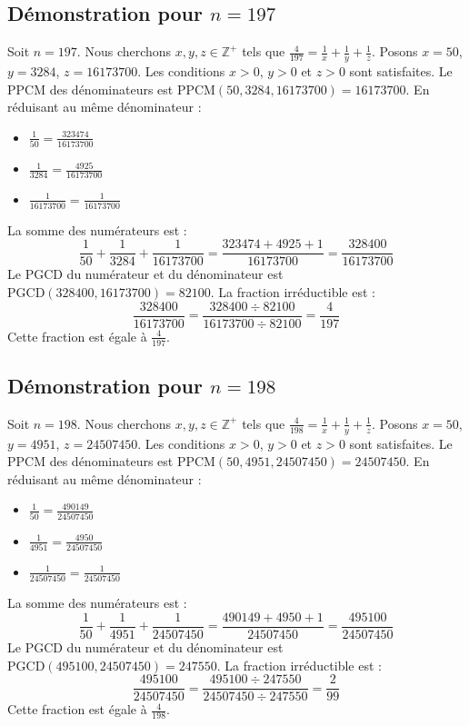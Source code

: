 \documentclass[11pt,a4paper]{article}
\begin{document}
\subsection{Démonstration pour $n = 197$}
Soit $n = 197$. Nous cherchons $x, y, z \in \mathbb{Z}^{+}$ tels que $\frac{4}{197} = \frac{1}{x} + \frac{1}{y} + \frac{1}{z}$.
Posons $x = 50$, $y = 3284$, $z = 16173700$.
Les conditions $x > 0$, $y > 0$ et $z > 0$ sont satisfaites.
Le PPCM des dénominateurs est $\text{PPCM}(50, 3284, 16173700) = 16173700$.
En réduisant au même dénominateur :
\begin{itemize}
    \item $\frac{1}{50} = \frac{323474}{16173700}$
    \item $\frac{1}{3284} = \frac{4925}{16173700}$
    \item $\frac{1}{16173700} = \frac{1}{16173700}$
\end{itemize}
La somme des numérateurs est :
$$ \frac{1}{50} + \frac{1}{3284} + \frac{1}{16173700} = \frac{323474 + 4925 + 1}{16173700} = \frac{328400}{16173700} $$
Le PGCD du numérateur et du dénominateur est $\text{PGCD}(328400, 16173700) = 82100$.
La fraction irréductible est :
$$ \frac{328400}{16173700} = \frac{328400 \div 82100}{16173700 \div 82100} = \frac{4}{197} $$
Cette fraction est égale à $\frac{4}{197}$.

\subsection{Démonstration pour $n = 198$}
Soit $n = 198$. Nous cherchons $x, y, z \in \mathbb{Z}^{+}$ tels que $\frac{4}{198} = \frac{1}{x} + \frac{1}{y} + \frac{1}{z}$.
Posons $x = 50$, $y = 4951$, $z = 24507450$.
Les conditions $x > 0$, $y > 0$ et $z > 0$ sont satisfaites.
Le PPCM des dénominateurs est $\text{PPCM}(50, 4951, 24507450) = 24507450$.
En réduisant au même dénominateur :
\begin{itemize}
    \item $\frac{1}{50} = \frac{490149}{24507450}$
    \item $\frac{1}{4951} = \frac{4950}{24507450}$
    \item $\frac{1}{24507450} = \frac{1}{24507450}$
\end{itemize}
La somme des numérateurs est :
$$ \frac{1}{50} + \frac{1}{4951} + \frac{1}{24507450} = \frac{490149 + 4950 + 1}{24507450} = \frac{495100}{24507450} $$
Le PGCD du numérateur et du dénominateur est $\text{PGCD}(495100, 24507450) = 247550$.
La fraction irréductible est :
$$ \frac{495100}{24507450} = \frac{495100 \div 247550}{24507450 \div 247550} = \frac{2}{99} $$
Cette fraction est égale à $\frac{4}{198}$.
\end{document}
